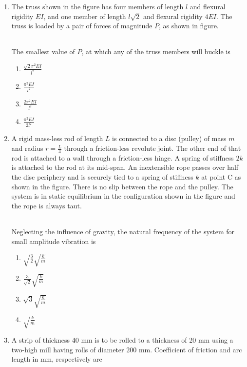 \documentclass[journal]{IEEEtran}
\begin{document}
\begin{enumerate}
\item The truss shown in the figure has four members of length $l$ and flexural rigidity $EI$, and one member of length $l\sqrt{2}$ and flexural rigidity $4EI$. The truss is loaded by a pair of forces of magnitude $P$, as shown in figure.
\begin{figure}[!ht]
\centering
\resizebox{0.5\textwidth}{!}{%

}%
\end{figure}\\
The smallest value of $P$, at which any of the truss members will buckle is
\begin{enumerate}
    \item $\frac{\sqrt{2}\pi^2EI}{l^2}$
    \item $\frac{\pi^2EI}{l^2}$
    \item $\frac{2\pi^2EI}{l^2}$
    \item $\frac{\pi^2EI}{2l^2}$ \\
\end{enumerate}
\item A rigid mass-less rod of length $L$ is connected to a disc (pulley) of mass $m$ and radius $r = \frac{L}{4}$ through a friction-less revolute joint. The other end of that rod is attached to a wall through a friction-less hinge. A spring of stiffness $2k$ is attached to the rod at its mid-span. An inextensible rope passes over half the disc periphery and is securely tied to a spring of stiffness $k$ at point C as shown in the figure. There is no slip
between the rope and the pulley. The system is in static equilibrium in the configuration shown in the figure and the rope is always taut.
\pagebreak
\begin{figure}[!ht]
\centering
\resizebox{0.5\textwidth}{!}{%

}%
\end{figure}\\
Neglecting the influence of gravity, the natural frequency of the system for small amplitude vibration is 
\begin{enumerate}
    \item $\sqrt{\frac{3}{2}}\sqrt{\frac{k}{m}}$
    \item $\frac{3}{\sqrt{2}}\sqrt{\frac{k}{m}}$
    \item $\sqrt{3}\sqrt{\frac{k}{m}}$
    \item $\sqrt{\frac{k}{m}}$ \\
\end{enumerate}
\item A strip of thickness 40 mm is to be rolled to a thickness of 20 mm using a two-high mill having rolls of diameter 200 mm. Coefficient of friction and arc length in mm, respectively are

\end{enumerate}
\end{document}
